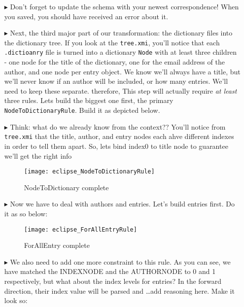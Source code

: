 \begin{itemize}
\item[$\blacktriangleright$] Don't forget to update the schema with your newest correspondence! When you saved, you should have received an error about it.

\item[$\blacktriangleright$] Next, the third major part of our transformation: the dictionary files into the dictionary tree. If you look at the
\texttt{tree.xmi}, you'll notice that each \texttt{.dictioanry} file is turned into a dictionary \texttt{Node} with at least three children - one node for the
title of the dictionary, one for the email address of the author, and one node per entry object. We know we'll always have a title, but we'll never know if an
author will be included, or how many entries. We'll need to keep these separate. therefore, This step will actually require \emph{at least} three rules. Lets
build the biggest one first, the primary \texttt{NodeToDictionaryRule}. Build it as depicted below.

\item[$\blacktriangleright$] Think: what do we already know from the context?? You'll notice from \texttt{tree.xmi} that the title, author, and entry nodes each
ahve different indexes in order to tell them apart. So, lets bind index0 to title node to guarantee we'll get the right info

\begin{figure}[htbp]
\begin{center}
  \texttt{[image: eclipse\_NodeToDictionaryRule]}
  \caption{NodeToDictionary complete}
  \label{eclipse:NodeToDictionaryRule}
\end{center}
\end{figure}

\item[$\blacktriangleright$] Now we have to deal with authors and entries. Let's build entries first. Do it as so below:

\begin{figure}[htbp]
\begin{center}
  \texttt{[image: eclipse\_ForAllEntryRule]}
  \caption{ForAllEntry complete}
  \label{eclipse:NodeToDictionaryRule}
\end{center}
\end{figure}

\item[$\blacktriangleright$] We also need to add one more constraint to this rule. As you can see, we have matched the INDEXNODE and the AUTHORNODE to 0 and 1
respectively, but what about the index levels for entries? In the forward direction, their index value will be parsed and \ldots add reasoning here. Make it
look so:


\end{itemize}
